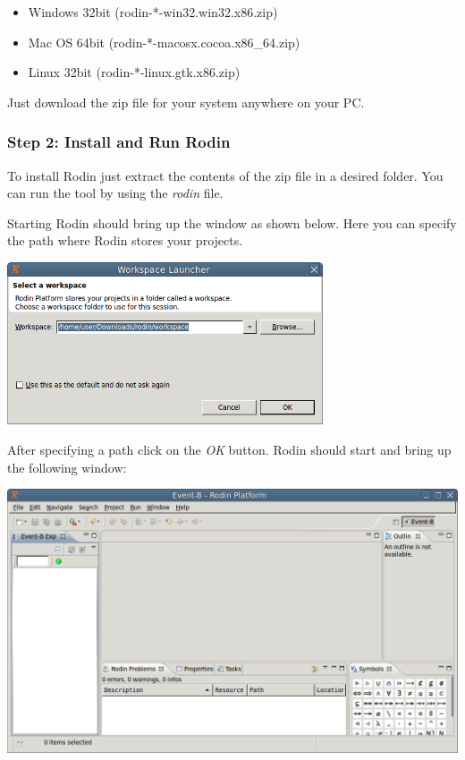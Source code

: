 \begin{itemize}
	\item Windows 32bit (rodin-*-win32.win32.x86.zip)
	\item Mac OS 64bit (rodin-*-macosx.cocoa.x86\_64.zip)
	\item Linux 32bit (rodin-*-linux.gtk.x86.zip)
\end{itemize}

Just download the zip file for your system anywhere on your PC.


\subsubsection{Step 2: Install and Run Rodin}

To install Rodin just extract the contents of the zip file in a desired folder. You can run the tool by using the \textit{rodin} file.

Starting Rodin should bring up the window as shown below. Here you can specify the path where Rodin stores your projects.

\begin{center}
	\includegraphics[width=0.7\textwidth]{img/tutorial/install2.png}
\end{center}

After specifying a path click on the \textit{OK} button. Rodin should start and bring up the following window:

\begin{center}
	\includegraphics[width=1.0\textwidth]{img/tutorial/install3.png}
\end{center}

